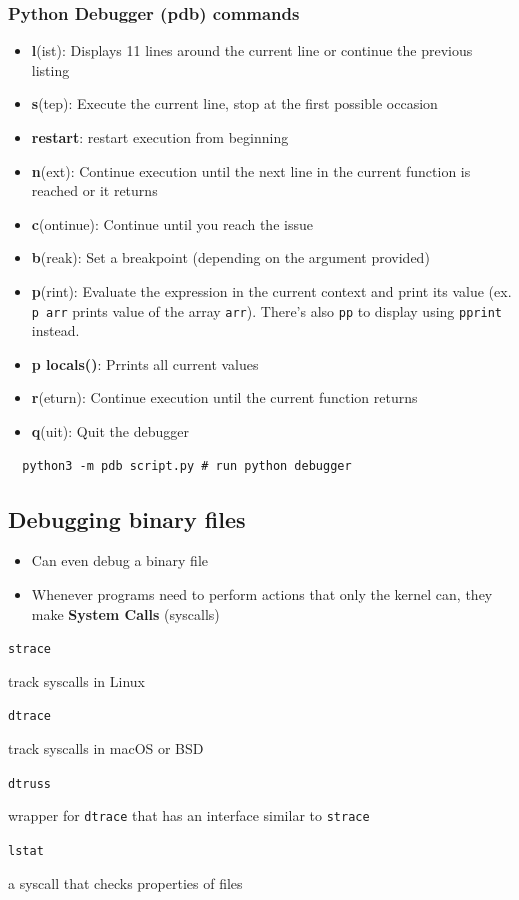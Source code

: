 \documentclass[letterpaper,12pt]{article}
\newcommand*{\lstitem}[1]{
  \setbox0\hbox{\lstinline{#1}}
  \item[\usebox0]
}
\begin{document}
\subsubsection{Python Debugger (pdb) commands}
\begin{itemize}
 \item \textbf{l}(ist): Displays 11 lines around the current line or continue the previous listing
 \item \textbf{s}(tep): Execute the current line, stop at the first possible occasion
 \item \textbf{restart}: restart execution from beginning
 \item \textbf{n}(ext): Continue execution until the next line in the current function is reached or it returns
 \item \textbf{c}(ontinue): Continue until you reach the issue
 \item \textbf{b}(reak): Set a breakpoint (depending on the argument provided)
 \item \textbf{p}(rint): Evaluate the expression in the current context and print its value (ex. \lstinline{p arr} prints value of the array \lstinline{arr}). There’s also \lstinline{pp} to display using \lstinline{pprint} instead.
 \item \textbf{p locals()}: Prrints all current values
 \item \textbf{r}(eturn): Continue execution until the current function returns
 \item \textbf{q}(uit): Quit the debugger
\end{itemize}

\begin{lstlisting}
  python3 -m pdb script.py # run python debugger
\end{lstlisting}

\subsection{Debugging binary files}

\begin{itemize}
 \item Can even debug a binary file
 \item Whenever programs need to perform actions that only the kernel can, they make \textbf{System Calls} (syscalls)
\end{itemize}

\begin{description}
 \lstitem{strace} track syscalls in Linux
 \lstitem{dtrace} track syscalls in macOS or BSD
 \lstitem{dtruss} wrapper for \lstinline{dtrace} that has an interface similar to \lstinline{strace}
 \lstitem{lstat} a syscall that checks properties of files
\end{description}
\end{document}
